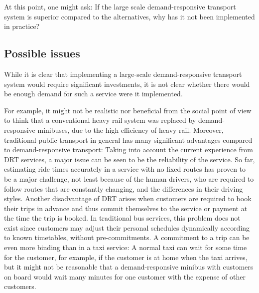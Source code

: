 \documentclass[dissertation,draft*]{aaltoseries}
\begin{document}
At this point, one might ask: If the large scale demand-responsive transport system is superior 
compared to the alternatives, why has it not been implemented in practice? 

\subsection{Possible issues} %
While it is clear that implementing a large-scale demand-responsive transport system 
would require significant investments, it is not clear 
whether there would be enough demand for such a service were it implemented. 

For example, it might not be realistic nor beneficial from the social point of view 
to think that a conventional heavy rail system was replaced by demand-responsive minibuses, 
due to the high efficiency of heavy rail.
Moreover, traditional public transport in general has many significant advantages compared to
demand-responsive transport: Taking into account the current experience from DRT services,
a major issue can be seen to be the reliability of the service. So far, estimating ride times accurately
in a service with no fixed routes has proven to be a major challenge, not least because
of the human drivers, who are required to follow routes that are constantly changing, and the
differences in their driving styles. Another disadvantage of DRT arises when customers are 
required to book their trips in advance and thus commit themselves to the service or payment
at the time the trip is booked. In traditional bus services, this problem does not
exist since customers may adjust their personal schedules dynamically according to known timetables,
without pre-commitments. A commitment to a trip can be even more binding than in a taxi service:
A normal taxi can wait for some time for the customer, for example, if the customer is at home 
when the taxi arrives, but it might not be reasonable that a demand-responsive minibus with 
customers on board would wait many minutes for one customer with the expense of other customers.
\end{document}
